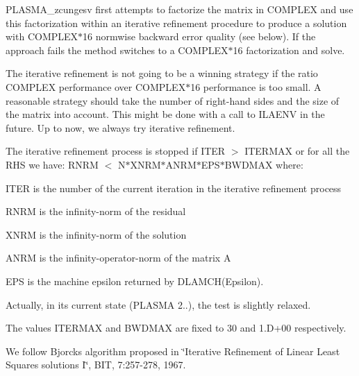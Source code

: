 P\+L\+A\+S\+M\+A\+\_\+zcungesv first attempts to factorize the matrix in C\+O\+M\+P\+L\+E\+X and use this factorization within an iterative refinement procedure to produce a solution with C\+O\+M\+P\+L\+E\+X$\ast$16 normwise backward error quality (see below). If the approach fails the method switches to a C\+O\+M\+P\+L\+E\+X$\ast$16 factorization and solve.

The iterative refinement is not going to be a winning strategy if the ratio C\+O\+M\+P\+L\+E\+X performance over C\+O\+M\+P\+L\+E\+X$\ast$16 performance is too small. A reasonable strategy should take the number of right-\/hand sides and the size of the matrix into account. This might be done with a call to I\+L\+A\+E\+N\+V in the future. Up to now, we always try iterative refinement.

The iterative refinement process is stopped if I\+T\+E\+R $>$ I\+T\+E\+R\+M\+A\+X or for all the R\+H\+S we have\+: R\+N\+R\+M $<$ N$\ast$\+X\+N\+R\+M$\ast$\+A\+N\+R\+M$\ast$\+E\+P\+S$\ast$\+B\+W\+D\+M\+A\+X where\+:


\begin{DoxyItemize}
\item I\+T\+E\+R is the number of the current iteration in the iterative refinement process
\item R\+N\+R\+M is the infinity-\/norm of the residual
\item X\+N\+R\+M is the infinity-\/norm of the solution
\item A\+N\+R\+M is the infinity-\/operator-\/norm of the matrix A
\item E\+P\+S is the machine epsilon returned by D\+L\+A\+M\+C\+H(\textquotesingle{}Epsilon\textquotesingle{}).
\end{DoxyItemize}

Actually, in its current state (P\+L\+A\+S\+M\+A 2..), the test is slightly relaxed.

The values I\+T\+E\+R\+M\+A\+X and B\+W\+D\+M\+A\+X are fixed to 30 and 1.\+D+00 respectively.

We follow Bjorck\textquotesingle{}s algorithm proposed in \char`\"{}\+Iterative Refinement of Linear
 Least Squares solutions I\char`\"{}, B\+I\+T, 7\+:257-\/278, 1967.


